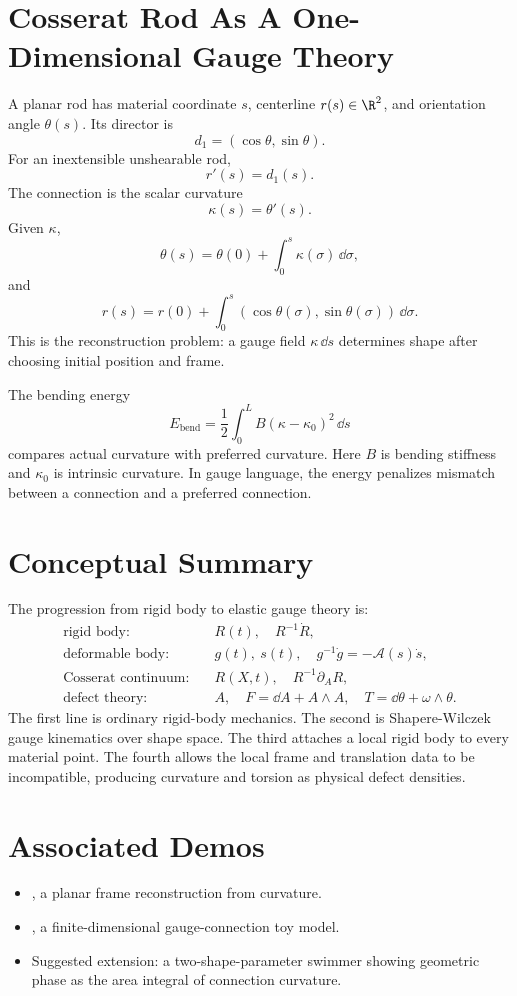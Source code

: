 \section{Cosserat Rod As A One-Dimensional Gauge Theory}
\label{sec:cosserat-rod}

A planar rod has material coordinate \(s\), centerline \(r(s)\in\R^2\), and
orientation angle \(\theta(s)\). Its director is
\[
  d_1=(\cos\theta,\sin\theta).
\]
For an inextensible unshearable rod,
\[
  r'(s)=d_1(s).
\]
The connection is the scalar curvature
\[
  \kappa(s)=\theta'(s).
\]
Given \(\kappa\),
\[
  \theta(s)=\theta(0)+\int_0^s\kappa(\sigma)\,\dd\sigma,
\]
and
\[
  r(s)=r(0)+\int_0^s
  (\cos\theta(\sigma),\sin\theta(\sigma))\,\dd\sigma.
\]
This is the reconstruction problem: a gauge field \(\kappa\,\dd s\) determines
shape after choosing initial position and frame.

The bending energy
\[
  E_{\mathrm{bend}}
  =
  \frac12\int_0^L B(\kappa-\kappa_0)^2\,\dd s
\]
compares actual curvature with preferred curvature. Here \(B\) is bending
stiffness and \(\kappa_0\) is intrinsic curvature. In gauge language, the
energy penalizes mismatch between a connection and a preferred connection.

\section{Conceptual Summary}
\label{sec:elastic-conceptual-summary}

The progression from rigid body to elastic gauge theory is:
\[
\begin{aligned}
  \text{rigid body:}&\quad R(t),\quad R^{-1}\dot R,\\
  \text{deformable body:}&\quad g(t),\ s(t),\quad g^{-1}\dot g=-\mathcal A(s)\dot s,\\
  \text{Cosserat continuum:}&\quad R(X,t),\quad R^{-1}\partial_A R,\\
  \text{defect theory:}&\quad A,\quad F=\dd A+A\wedge A,\quad T=\dd\theta+\omega\wedge\theta.
\end{aligned}
\]
The first line is ordinary rigid-body mechanics. The second is
Shapere-Wilczek gauge kinematics over shape space. The third attaches a local
rigid body to every material point. The fourth allows the local frame and
translation data to be incompatible, producing curvature and torsion as physical
defect densities.

\section{Associated Demos}
\label{sec:elastic-associated-demos}

\begin{itemize}
\item {}, a planar frame reconstruction
from curvature.
\item {}, a finite-dimensional
gauge-connection toy model.
\item Suggested extension: a two-shape-parameter swimmer showing geometric phase
as the area integral of connection curvature.
\end{itemize}
